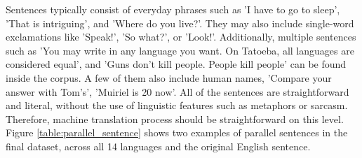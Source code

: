 \documentclass[a4paper]{article}
\begin{document}
Sentences typically consist of everyday phrases such as 'I have to go to sleep', 'That is intriguing', and 'Where do you live?'. They may also include single-word exclamations like 'Speak!', 'So what?', or 'Look!'. Additionally, multiple sentences such as 'You may write in any language you want. On Tatoeba, all languages are considered equal', and 'Guns don't kill people. People kill people' can be found inside the corpus. A few of them also include human names, 'Compare your answer with Tom's', 'Muiriel is 20 now'. All of the sentences are straightforward and literal, without the use of linguistic features such as metaphors or sarcasm. Therefore, machine translation process should be straightforward on this level. Figure \ref{table:parallel_sentence} shows two examples of parallel sentences in the final dataset, across all 14 languages and the original English sentence.
\end{document}
